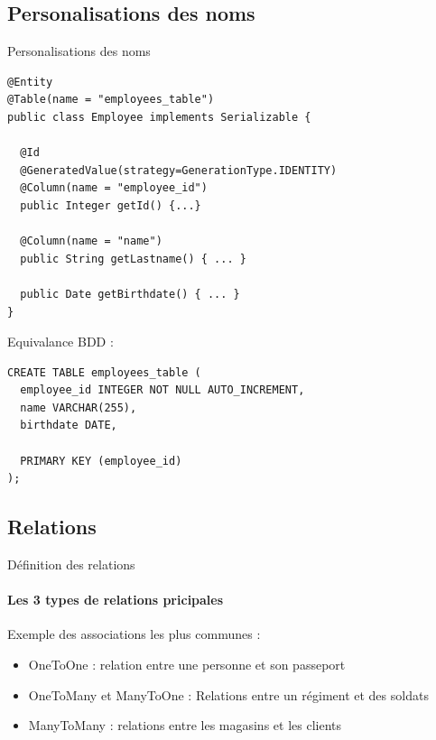 \documentclass[compress]{beamer}%
\begin{document}
\subsection{Personalisations des noms}
\begin{frame}[fragile]{Personalisations des noms}
	
	\begin{lstlisting}
@Entity
@Table(name = "employees_table")
public class Employee implements Serializable {

  @Id
  @GeneratedValue(strategy=GenerationType.IDENTITY)
  @Column(name = "employee_id")
  public Integer getId() {...}
    
  @Column(name = "name")
  public String getLastname() { ... }
  
  public Date getBirthdate() { ... }
}
	\end{lstlisting}
	
	\pause
	Equivalance BDD : 
	\begin{lstlisting}
CREATE TABLE employees_table (
  employee_id INTEGER NOT NULL AUTO_INCREMENT,
  name VARCHAR(255),
  birthdate DATE,
  
  PRIMARY KEY (employee_id)
);
	\end{lstlisting}
	
\end{frame}


\subsection{Relations}

\begin{frame}{Définition des relations}
	\framesubtitle{Les 3 types de relations pricipales}
	
	Exemple des associations les plus communes :
	\begin{itemize}[<+->]
		\item OneToOne : relation entre une personne et son passeport
		\item OneToMany et ManyToOne : Relations entre un régiment et des soldats
		\item ManyToMany : relations entre les magasins et les clients
	\end{itemize}

\end{frame}
\end{document}
